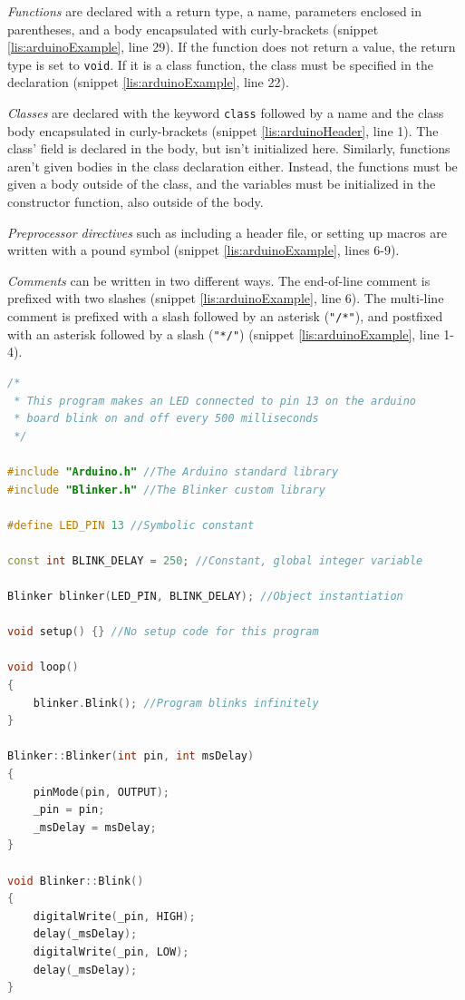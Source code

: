 \textit{Functions} are declared with a return type, a name, parameters enclosed in parentheses, and a body encapsulated with curly-brackets (snippet \ref{lis:arduinoExample}, line 29).
If the function does not return a value, the return type is set to \texttt{void}.
If it is a class function, the class must be specified in the declaration (snippet \ref{lis:arduinoExample}, line 22).

\textit{Classes} are declared with the keyword \texttt{class} followed by a name and the class body encapsulated in curly-brackets (snippet \ref{lis:arduinoHeader}, line 1).
The class' field is declared in the body, but isn't initialized here.
Similarly, functions aren't given bodies in the class declaration either.
Instead, the functions must be given a body outside of the class, and the variables must be initialized in the constructor function, also outside of the body.

\textit{Preprocessor directives} such as including a header file, or setting up macros are written with a pound symbol (snippet \ref{lis:arduinoExample}, lines 6-9).

\textit{Comments} can be written in two different ways.
The end-of-line comment is prefixed with two slashes (snippet \ref{lis:arduinoExample}, line 6).
The multi-line comment is prefixed with a slash followed by an asterisk (\texttt{"/*"}), and postfixed with an asterisk followed by a slash (\texttt{"*/"}) (snippet \ref{lis:arduinoExample}, line 1-4).

\begin{lstlisting}[language=C++,label=lis:arduinoExample,caption=An example program written in the Arduino language.,firstnumber=1]
/*
 * This program makes an LED connected to pin 13 on the arduino
 * board blink on and off every 500 milliseconds
 */

#include "Arduino.h" //The Arduino standard library
#include "Blinker.h" //The Blinker custom library

#define LED_PIN 13 //Symbolic constant

const int BLINK_DELAY = 250; //Constant, global integer variable

Blinker blinker(LED_PIN, BLINK_DELAY); //Object instantiation

void setup() {} //No setup code for this program

void loop()
{
    blinker.Blink(); //Program blinks infinitely
}

Blinker::Blinker(int pin, int msDelay)
{
	pinMode(pin, OUTPUT);
	_pin = pin;
	_msDelay = msDelay;
}

void Blinker::Blink()
{
	digitalWrite(_pin, HIGH);
	delay(_msDelay);
	digitalWrite(_pin, LOW);
	delay(_msDelay);
}

\end{lstlisting}

